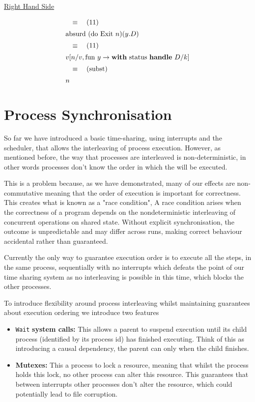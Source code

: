 \documentclass[logo,bsc,singlespacing,parskip]{infthesis}
\begin{document}
\underline{Right Hand Side}

\[
\begin{array}{l}
\quad\equiv\quad (11) \\[5pt]
\text{absurd (do Exit } n) (y. D) \\[5pt]
\quad\equiv\quad (11) \\[5pt]
v [n/v, \text{fun } y \rightarrow \text{\textbf{with} status \textbf{handle} } D/k] \\[5pt]
\quad\equiv\quad (\text{subst}) \\[5pt]
n
\end{array}
\]


\section{Process Synchronisation}

So far we have introduced a basic time-sharing, using interrupts and the scheduler, that allows the interleaving of process execution. However, as mentioned before, the way that processes are interleaved is non-deterministic, in other words processes don't know the order in which the will be executed. 

This is a problem because, as we have demonstrated, many of our effects are non-commutative meaning that the order of execution is important for correctness. This creates what is known as a "race condition", A race condition arises when the correctness of a program depends on the nondeterministic interleaving of concurrent operations on shared state. Without explicit synchronisation, the outcome is unpredictable and may differ across runs, making correct behaviour accidental rather than guaranteed.

Currently the only way to guarantee execution order is to execute all the steps, in the same process, sequentially with no interrupts which defeats the point of our time sharing system as no interleaving is possible in this time, which blocks the other processes.

To introduce flexibility around process interleaving whilst maintaining guarantees about execution ordering we introduce two features

\begin{itemize}
    \item \lstinline{Wait} \textbf{system calls: } This allows a parent to suspend execution until its child process (identified by its process id) has finished executing. Think of this as introducing a causal dependency, the parent can only when the child finishes.
    \item \textbf{Mutexes: } This a process to lock a resource, meaning that whilst the process holds this lock, no other process can alter this resource. This guarantees that between interrupts other processes don't alter the resource, which could potentially lead to file corruption. 
\end{itemize}
\end{document}
